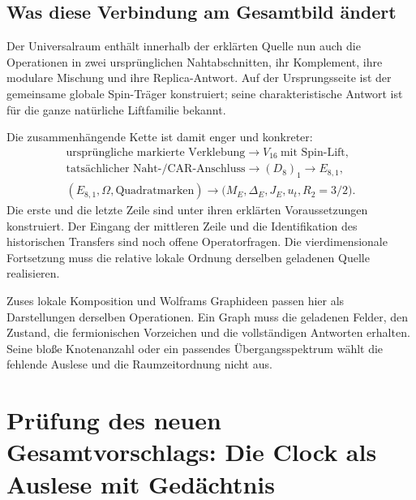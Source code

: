 \subsection{Was diese Verbindung am Gesamtbild ändert}
Der Universalraum enthält innerhalb der erklärten Quelle nun auch die Operationen in zwei ursprünglichen Nahtabschnitten, ihr Komplement, ihre modulare Mischung und ihre Replica-Antwort. Auf der Ursprungsseite ist der gemeinsame globale Spin-Träger konstruiert; seine charakteristische Antwort ist für die ganze natürliche Liftfamilie bekannt.

Die zusammenhängende Kette ist damit enger und konkreter:
\begin{equation}
\begin{gathered}
\text{ursprüngliche markierte Verklebung}
\longrightarrow V_{16}\ \text{mit Spin-Lift},\\
\text{tatsächlicher Naht-/CAR-Anschluss}
\longrightarrow(D_8)_1\longrightarrow E_{8,1},\\
(E_{8,1},\Omega,\text{Quadratmarken})
\longrightarrow
\bigl(M_E,\Delta_E,J_E,u_t,R_2=3/2\bigr).
\end{gathered}
\end{equation}
Die erste und die letzte Zeile sind unter ihren erklärten Voraussetzungen konstruiert. Der Eingang der mittleren Zeile und die Identifikation des historischen Transfers sind noch offene Operatorfragen. Die vierdimensionale Fortsetzung muss die relative lokale Ordnung derselben geladenen Quelle realisieren.


Zuses lokale Komposition und Wolframs Graphideen passen hier als Darstellungen derselben Operationen. Ein Graph muss die geladenen Felder, den Zustand, die fermionischen Vorzeichen und die vollständigen Antworten erhalten. Seine bloße Knotenanzahl oder ein passendes Übergangsspektrum wählt die fehlende Auslese und die Raumzeitordnung nicht aus.


\section{Prüfung des neuen Gesamtvorschlags: Die Clock als Auslese mit Gedächtnis}\label{sec:pairingcompletion}

